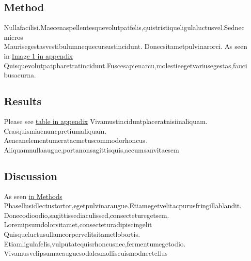 \documentclass[../main.tex]{subfiles}
\begin{document}
\subsection{Method}\noindent
\label{seTwo:method}
Nullafacilisi.Maecenaspellentesquevolutpatfelis,quistristiqueligulaluctusvel.Sednecmieros\\

Maurisegestasvestibulumnequecursustincidunt.\parencite{usability_inspection} Donecsitametpulvinarorci.
As seen in \hyperref[append:pic:one]{Image 1 in appendix}
Quisquevolutpatpharetratincidunt.Fuscesapienarcu,molestieegetvariusegestas,faucibusacurna.


\subsection{Results}\noindent
Please see \hyperref[append:example_table]{table in appendix}
Vivamustinciduntplaceratnisiinaliquam.
Crasquismiacnuncpretiumaliquam.
Aeneanelementumeratacmetuscommodorhoncus.
Aliquamnullaaugue,portanonsagittisquis,accumsanvitaesem


\subsection{Discussion}\noindent
\label{seTwo:discussion}
As seen \hyperref[secTwo:method]{in Methods}
Phasellusidlectustortor,egetpulvinaraugue.Etiamegetvelitacpurusfringillablandit.
Donecodioodio,sagittissediaculissed,consecteturegetsem.
Loremipsumdolorsitamet,consecteturadipiscingelit\\

Quisqueluctusullamcorpervelitsitametlobortis.
Etiamligulafelis,vulputatequisrhoncusnec,fermentumegetodio.
Vivamusvelipsumacauguesodalesmolliseuismodnectellus


\end{document}
